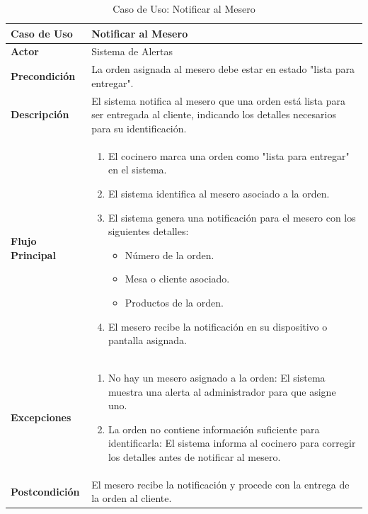 \documentclass{article}
\begin{document}
\begin{table}[H]
    \centering
    \begin{tabular}{|p{4cm}|p{11cm}|}
    \hline
    \textbf{Caso de Uso}        & \textbf{Notificar al Mesero} \\ \hline
    \textbf{Actor}              & Sistema de Alertas \\ \hline
    \textbf{Precondición}       & La orden asignada al mesero debe estar en estado "lista para entregar". \\ \hline
    \textbf{Descripción}        & El sistema notifica al mesero que una orden está lista para ser entregada al cliente, indicando los detalles necesarios para su identificación. \\ \hline
    \textbf{Flujo Principal}    & 
    \begin{enumerate}
        \item El cocinero marca una orden como "lista para entregar" en el sistema.
        \item El sistema identifica al mesero asociado a la orden.
        \item El sistema genera una notificación para el mesero con los siguientes detalles:
        \begin{itemize}
            \item Número de la orden.
            \item Mesa o cliente asociado.
            \item Productos de la orden.
        \end{itemize}
        \item El mesero recibe la notificación en su dispositivo o pantalla asignada.
    \end{enumerate} \\ \hline
    \textbf{Excepciones}        & 
    \begin{enumerate}
        \item No hay un mesero asignado a la orden: El sistema muestra una alerta al administrador para que asigne uno.
        \item La orden no contiene información suficiente para identificarla: El sistema informa al cocinero para corregir los detalles antes de notificar al mesero.
    \end{enumerate} \\ \hline
    \textbf{Postcondición}      & El mesero recibe la notificación y procede con la entrega de la orden al cliente. \\ \hline
    \end{tabular}
    \caption{Caso de Uso: Notificar al Mesero}
    \label{tab:notificar_mesero}
\end{table}
\end{document}

